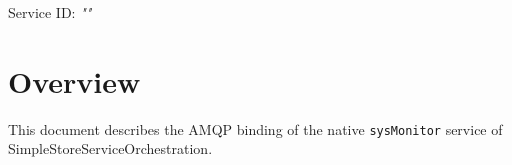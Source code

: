\documentclass[a4paper]{arrowhead}
\begin{document}
\sloppy

\ArrowheadSetup

\begin{center}
  \vspace*{1cm}
  \huge{\arrowtitle}

  \vspace*{0.2cm}
  \LARGE{\arrowtype}
  \vspace*{1cm}

  \Large{Service ID: \textit{"\arrowid"}}

  \vspace*{\fill}


  \vspace*{1cm}
  \vspace*{\fill}

  \begin{abstract}
    This document describes the AMQP 0-9-1 protocol with TLS payload security and JSON payload encoding variant of the \texttt{sysMonitor} service of the SimpleStoreServiceOrchestration system (SysMonitor-AMQP-IDD-5.2.2).
  \end{abstract}

  \vspace*{1cm}
\end{center}

\newpage

\tableofcontents
\newpage

\section{Overview}
\label{sec:overview}

This document describes the AMQP binding of the native \texttt{sysMonitor} service of SimpleStoreServiceOrchestration.
\end{document}
